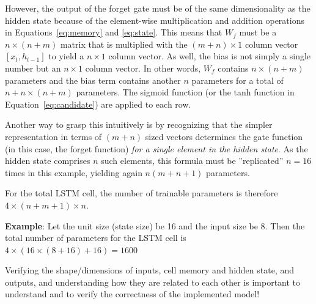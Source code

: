 However, the output of the forget gate must be of the same dimensionality as the hidden state because of the element-wise multiplication and addition operations in Equations~\ref{eq:memory} and \ref{eq:state}. This means that $W_f$ must be a $n \times (n+m)$ matrix that is multiplied with the $(m+n) \times 1$ column vector $[x_t, h_{t-1}]$ to yield a $n \times 1$ column vector. As well, the bias is not simply a single number but an $n \times 1$ column vector. In other words, $W_f$ contains $n \times (n+m)$ parameters and the bias term contains another $n$ parameters for a total of $n+n\times(n+m)$ parameters. The sigmoid function (or the tanh function in Equation~\ref{eq:candidate}) are applied to each row.

Another way to grasp this intuitively is by recognizing that the simpler representation in terms of $(m+n)$ sized vectors determines the gate function (in this case, the forget function) \emph{for a single element in the hidden state}. As the hidden state comprises $n$ such elements, this formula must be ''replicated'' $n=16$ times in this example, yielding again $n (m+n+1)$ parameters.

For the total LSTM cell, the number of trainable parameters is therefore $4 \times (n + m + 1) \times n$.

\textbf{Example}: Let the unit size (state size) be 16 and the input size be 8. Then the total number of parameters for the LSTM cell is $4 \times (16 \times (8+16) + 16) = 1600$

\begin{alertbox}
Verifying the shape/dimensions of inputs, cell memory and hidden state, and outputs, and understanding how they are related to each other is important to understand and to verify the correctness of the implemented model!
\end{alertbox}

